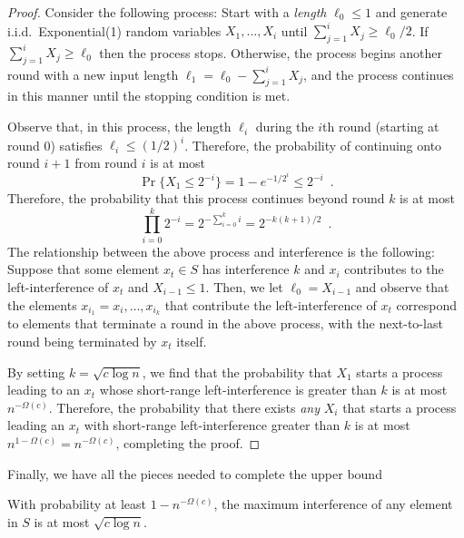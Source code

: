 \documentclass{patmorin}
\begin{document}
\begin{proof}
Consider the following process: Start with a \emph{length} $\ell_0 \le 1$
and generate i.i.d.\ Exponential(1) random variables $X_1,\ldots,X_i$
until $\sum_{j=1}^i {X_j} \ge \ell_0/2$. If $\sum_{j=1}^i {X_j} \ge
\ell_0$ then the process stops.  Otherwise, the process begins another
round with a new input length $\ell_1=\ell_0-\sum_{j=1}^i {X_j}$, and
the process continues in this manner until the stopping condition is met.

Observe that, in this process, the length $\ell_i$ during the $i$th
round (starting at round 0) satisfies $\ell_i\le (1/2)^i$.  Therefore,
the probability of continuing onto round $i+1$ from round $i$ is at most
\[
   \Pr\{X_1 \le 2^{-i}\} = 1-e^{-1/2^i} \le 2^{-i} \enspace .
\]
Therefore, the probability that this process continues beyond round $k$
is at most
\[
    \prod_{i=0}^{k} 2^{-i} = 2^{-\sum_{i=0}^{k} i} = 2^{-k(k+1)/2}
\enspace .
\]
The relationship between the above process and interference is the
following:  Suppose that some element $x_t\in S$ has interference $k$
and $x_i$ contributes to the left-interference of $x_t$ and $X_{i-1}\le
1$.  Then, we let $\ell_0=X_{i-1}$ and observe that the elements
$x_{i_1}=x_i,\ldots,x_{i_k}$ that contribute the left-interference of
$x_t$ correspond to elements that terminate a round in the above process,
with the next-to-last round being terminated by $x_t$ itself.

By setting $k=\sqrt{c\log n}$, we find that the probability that $X_{1}$
starts a process leading to an $x_t$ whose short-range left-interference is
greater than $k$ is at most $n^{-\Omega(c)}$.  Therefore, the probability that
there exists \emph{any} $X_i$ that starts a process leading an $x_t$ with
short-range left-interference greater than $k$ is at most
$n^{1-\Omega(c)}=n^{-\Omega(c)}$, completing the proof.
\end{proof}


Finally, we have all the pieces needed to complete the upper bound

\begin{lem}
With probability at least $1-n^{-\Omega(c)}$, the maximum interference of
any element in $S$ is at most $\sqrt{c\log n}$.
\end{lem}
\end{document}
